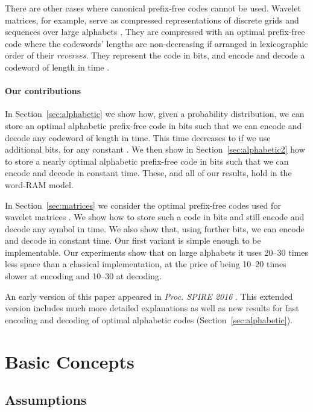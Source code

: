 \documentclass[preprint,12pt]{elsarticle}
\begin{document}
There are other cases where canonical prefix-free codes cannot be used.
Wavelet matrices, for example, serve as compressed representations of discrete 
grids and sequences over large alphabets \cite{CNO15}. They are compressed with
an optimal prefix-free code where the codewords' lengths are non-decreasing if 
arranged in lexicographic order of their {\em reverses}. They 
represent the code in  bits, and encode and decode a codeword 
of length  in time . 

\paragraph{Our contributions}

In Section~\ref{sec:alphabetic} we show how, given a probability distribution,
we can store an optimal alphabetic prefix-free code in  
bits such that we can encode and decode any codeword of length  in 
 time. This time decreases to  
if we use  additional bits, for any constant .
We then show in Section~\ref{sec:alphabetic2}
how to store a nearly optimal alphabetic prefix-free code in 
 bits such that we can encode and decode in constant time.  
These, and all of our results, hold in the word-RAM model.

In Section~\ref{sec:matrices} we consider the optimal prefix-free codes used
for wavelet matrices \cite{CNO15}. We show how to store such a code in 
 bits and still encode and decode any symbol in 
 time. We also show that, using  further bits, 
we can encode and decode in constant time.
Our first variant is simple enough to be implementable. Our
experiments show that on large alphabets it uses 20--30 times less space 
than a classical implementation, at the price of being 10--20 times slower at 
encoding and 10--30 at decoding.

An early version of this paper appeared in {\em Proc. SPIRE 2016} 
\cite{SPIRE16}. This extended version includes much more detailed 
explanations as well as new results for fast encoding and decoding of
optimal alphabetic codes (Section~\ref{sec:alphabetic}).

\section{Basic Concepts}

\subsection{Assumptions}
\label{sec:assumptions}
\end{document}
